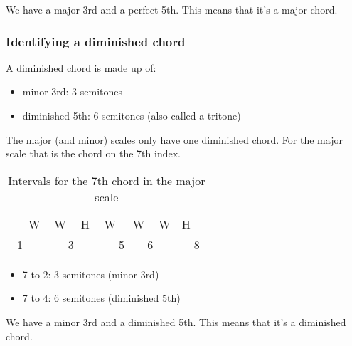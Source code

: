 We have a major 3rd and a perfect 5th. This means that it's a major chord.

\subsubsection{Identifying a diminished chord}

A diminished chord is made up of:

\begin{itemize}
	\item minor 3rd: 3 semitones
	\item diminished 5th: 6 semitones (also called a tritone)
\end{itemize}


The major (and minor) scales only have one diminished chord. For the major scale that is the chord on the 7th index.

\begin{table}[h]
	\centering
	\begin{tabular}{*{16}{c}}
		& \multicolumn{2}{P{4mm}}{\large{W}} & \multicolumn{2}{P{4mm}}{\large{W}} & \multicolumn{2}{P{4mm}}{\large{H}} & \multicolumn{2}{P{4mm}}{\large{W}} & \multicolumn{2}{P{4mm}}{\large{W}} & \multicolumn{2}{P{4mm}}{\large{W}} & \multicolumn{2}{P{4mm}}{\large{H}} & \\
		\multicolumn{2}{P{4mm}}{1} & \multicolumn{2}{P{4mm}}{\ScaleCellFill 2} & \multicolumn{2}{P{4mm}}{3} & \multicolumn{2}{P{4mm}}{\ScaleCellFill 4} & \multicolumn{2}{P{4mm}}{5} & \multicolumn{2}{P{4mm}}{6} & \multicolumn{2}{P{4mm}}{\ScaleRootCellFill 7} & \multicolumn{2}{P{4mm}}{8}
	\end{tabular}
	\caption{Intervals for the 7th chord in the major scale}
	\label{tab:guitar_major_scale_7th_chord_identify}
\end{table}

\begin{itemize}
	\item 7 to 2: 3 semitones (minor 3rd)
	\item 7 to 4: 6 semitones (diminished 5th)
\end{itemize}

We have a minor 3rd and a diminished 5th. This means that it's a diminished chord.

